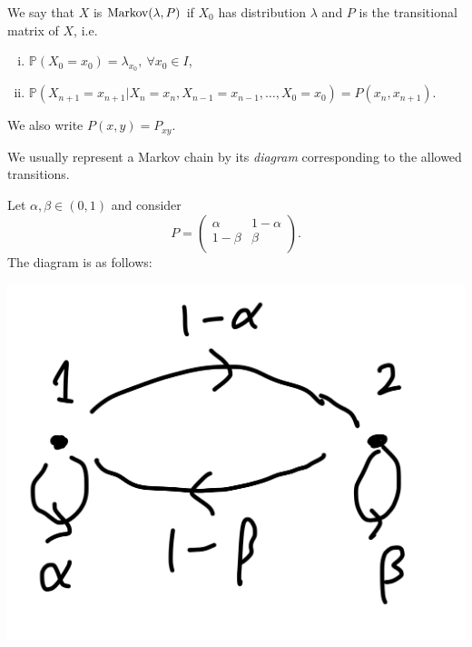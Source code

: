 \documentclass[a4paper]{article}
\begin{document}
\begin{definition}
    We say that $X$ is $ \operatorname{Markov}(\lambda,P) $ if $ X_0 $ has distribution $\lambda$ and $ P $ is the transitional matrix of $X$, i.e. 
    \begin{enumerate}[(i)]
        \item $ \mathbb{P}(X_0=x_0)=\lambda_{x_0},\ \forall x_0\in I $,
        \item $ \mathbb{P}(X_{n+1}=x_{n+1}|X_n=x_n, X_{n-1}=x_{n-1}, \dots, X_0=x_0) = P(x_{n},x_{n+1}) $.
    \end{enumerate}
\end{definition}
\begin{note}
    We also write $ P(x,y)=P_{xy} $.
\end{note}

We usually represent a Markov chain by its \textit{diagram} corresponding to the allowed transitions.
\begin{example}
    Let $ \alpha,\beta\in (0,1) $ and consider 
    \[
        P = \begin{pmatrix}
            \alpha & 1-\alpha \\
            1-\beta & \beta \\
        \end{pmatrix}.
    \]
    The diagram is as follows:
    \begin{center}
        \includegraphics[scale=0.07]{markov1.jpeg}
    \end{center}
\end{example}
\end{document}
